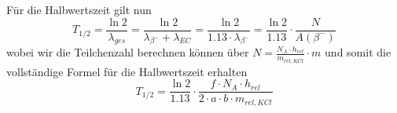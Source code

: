Für die Halbwertszeit gilt nun
\begin{equation}
 T_{1/2} = \frac{\ln 2}{\lambda_{ges}} = \frac{\ln 2}{\lambda_{\beta^-} + \lambda_{EC}} = \frac{\ln 2}{1.13 \cdot \lambda_{\beta^-}} = \frac{\ln 2}{1.13} \cdot \frac{N}{A \left( \beta^- \right)}
\end{equation}
wobei wir die Teilchenzahl berechnen können über $N = \frac{N_A \cdot h_{rel}}{m_{rel,KCl}} \cdot m$ und somit die vollständige Formel für die Halbwertszeit erhalten
\begin{equation}
 T_{1/2} = \frac{\ln 2}{1.13} \cdot \frac{f \cdot N_A \cdot h_{rel}}{2 \cdot a \cdot b \cdot m_{rel,KCl}} \label{t12beta}
\end{equation}

